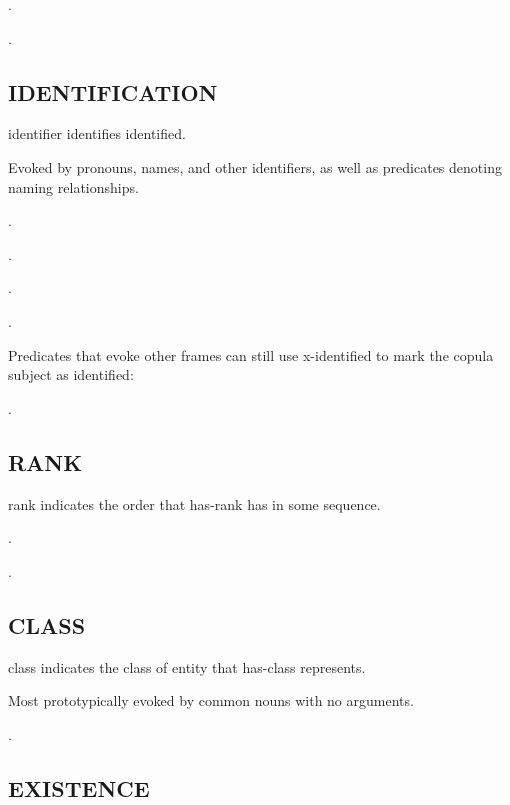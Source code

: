 \documentclass[a4paper]{article}
\newcommand{\fr}[1]{\textsf{#1}}
\newcommand{\rl}[1]{\textsf{#1}}
\begin{document}
\ex.

\ex.

\subsection{\fr{IDENTIFICATION}}
\label{sec:IDENTIFICATION}

\rl{identifier} identifies \rl{identified}.

Evoked by pronouns, names, and other identifiers, as well as predicates
denoting naming relationships.

\ex.

\ex.

\ex.

\ex.

Predicates that evoke other frames can still use \rl{x-identified} to mark the
copula subject as identified:

\ex.

\subsection{\fr{RANK}}
\label{sec:RANK}

\rl{rank} indicates the order that \rl{has-rank} has in some sequence.

\ex.

\ex.

\subsection{\fr{CLASS}}
\label{sec:CLASS}

\rl{class} indicates the class of entity that \rl{has-class} represents.

Most prototypically evoked by common nouns with no arguments.

\ex.

\subsection{\fr{EXISTENCE}}
\label{sec:EXISTENCE}
\end{document}
